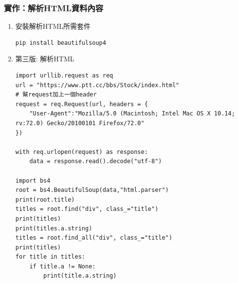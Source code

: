 \documentclass[a4paper,12pt]{article}
\begin{document}
\subsubsection{實作：解析HTML資料內容}
\label{sec:org7de1d18}
\begin{enumerate}
\item 安裝解析HTML所需套件
\label{sec:org64c0039}
\lstset{breaklines=true,language=shell,label= ,caption= ,captionpos=b,numbers=none}
\begin{lstlisting}
pip install beautifulsoup4
\end{lstlisting}

\item 第三版: 解析HTML
\label{sec:orgfac7f19}
\lstset{breaklines=true,language=Python,label= ,caption= ,captionpos=b,firstnumber=1,numbers=left}
\begin{lstlisting}
import urllib.request as req
url = "https://www.ptt.cc/bbs/Stock/index.html"
# 幫request加上一個header
request = req.Request(url, headers = {
    "User-Agent":"Mozilla/5.0 (Macintosh; Intel Mac OS X 10.14; rv:72.0) Gecko/20100101 Firefox/72.0"
})

with req.urlopen(request) as response:
    data = response.read().decode("utf-8")

import bs4
root = bs4.BeautifulSoup(data,"html.parser")
print(root.title)
titles = root.find("div", class_="title")
print(titles)
print(titles.a.string)
titles = root.find_all("div", class_="title")
print(titles)
for title in titles:
    if title.a != None:
        print(title.a.string)
\end{lstlisting}


\end{enumerate}
\end{document}
